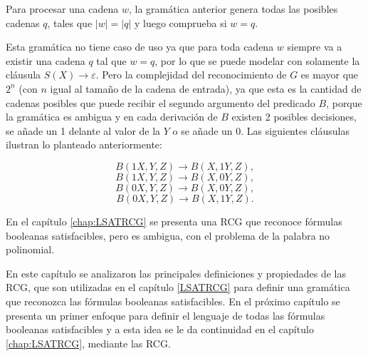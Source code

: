 \documentclass[12pt]{article}
\begin{document}
Para procesar una cadena $w$, la gramática anterior genera todas las posibles cadenas $q$, tales que $|w|=|q|$ y luego comprueba si $w = q$.

Esta gramática no tiene caso de uso ya que para toda cadena $w$ siempre va a existir una cadena $q$ tal que $w=q$, 
por lo que se puede modelar con solamente la cláusula $S(X)\to \varepsilon$. Pero la complejidad del 
reconocimiento de $G$ es mayor que $2^n$ (con $n$ igual al tamaño de la cadena de entrada), ya que esta es la 
cantidad de cadenas posibles que puede recibir el segundo argumento del predicado $B$, porque la gramática es 
ambigua y en cada derivación de $B$ existen 2 posibles decisiones, se añade un 1 delante al valor de la $Y$ o 
se añade un $0$. Las siguientes cláusulas ilustran lo planteado anteriormente:

$$B(1X,Y,Z)\to B(X,1Y,Z),$$
$$B(1X,Y,Z)\to B(X,0Y,Z),$$
$$B(0X,Y,Z)\to B(X,0Y,Z),$$
$$B(0X,Y,Z)\to B(X,1Y,Z).$$

En el capítulo \ref{chap:LSATRCG} se presenta una RCG que reconoce fórmulas booleanas satisfacibles,
pero es ambigua, con el problema de la palabra no polinomial.

En este capítulo se analizaron las principales definiciones y propiedades de las RCG, que son utilizadas en el capítulo \ref{LSATRCG} para definir una gramática que reconozca las fórmulas booleanas satisfacibles.  En el próximo capítulo se presenta un primer enfoque para definir el lenguaje de todas las fórmulas booleanas satisfacibles y a esta idea se le da continuidad en el capítulo \ref{chap:LSATRCG}, mediante las RCG.
\end{document}
